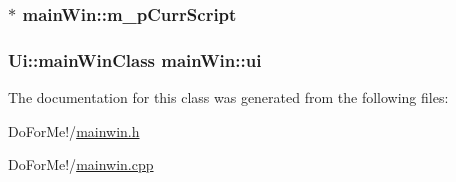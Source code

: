 \hypertarget{classmain_win_ab391602112d6c25f237da91eae815d47}{
\subsubsection[{m\-\_\-p\-Curr\-Script}]{$\ast$ main\-Win\-::m\-\_\-p\-Curr\-Script\hspace{0.3cm}{\ttfamily [private]}}}\label{classmain_win_ab391602112d6c25f237da91eae815d47}
\hypertarget{classmain_win_a89fa9d3006573378f3195845fe9ed408}{
\subsubsection[{ui}]{\setlength{\rightskip}{0pt plus 5cm}Ui\-::main\-Win\-Class main\-Win\-::ui\hspace{0.3cm}{\ttfamily [private]}}}\label{classmain_win_a89fa9d3006573378f3195845fe9ed408}


The documentation for this class was generated from the following files\-:\begin{DoxyCompactItemize}
\item 
Do\-For\-Me!/\hyperlink{mainwin_8h}{mainwin.\-h}\item 
Do\-For\-Me!/\hyperlink{mainwin_8cpp}{mainwin.\-cpp}\end{DoxyCompactItemize}
